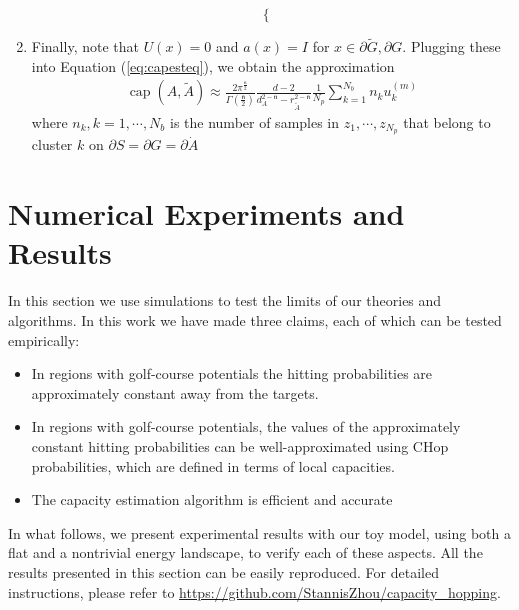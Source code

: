 \documentclass[english, aip, jcp, priprint, graphicx,floatfix]{revtex4-1}
\theoremstyle{plain}
\theoremstyle{definition}
\theoremstyle{plain}
\newcommand{\dimension}{{\mathfrak{n}}}
\begin{document}
\begin{enumerate}
\[\begin{cases}
\end{cases}
\]
\item Finally, note that $U (x) = 0$ and $a (x) = I$ for $x
\in \partial \tilde{G},\partial G$.  Plugging these into Equation (\ref{eq:capesteq}), we obtain the approximation
%
\begin{gather}
	\ensuremath{\operatorname{cap}} (A, \tilde{A}) \approx \frac{2\pi^{\frac{\dimension}{2}}}{\Gamma(\frac{\dimension}{2})}\frac{d-2}{d_A^{2-\dimension}-r_{\tilde A}^{2-\dimension}}\frac{1}{N_p} \sum_{k=1}^{N_b}n_k u_k^{(m)}
\end{gather}
where $n_k, k=1, \cdots, N_b$ is the number of samples in $z_1, \cdots, z_{N_p}$ that belong to cluster $k$ on $\partial S=\partial G=\partial \dot{A}$
%
\end{enumerate}


                                     


\section{Numerical Experiments and Results}\label{sec:experiments}
In this section we use simulations to test the limits of our theories and algorithms.  In this work we have made three claims, each of which can be tested empirically:

\begin{itemize}
\item In regions with golf-course potentials the hitting probabilities are approximately constant away from the targets.
\item In regions with golf-course potentials, the values of the approximately constant hitting probabilities can be well-approximated using CHop probabilities, which are defined in terms of local capacities.
\item The capacity estimation algorithm is efficient and accurate
\end{itemize}

In what follows, we present experimental results with our toy model, using both a flat and a nontrivial energy landscape, to verify each of these aspects.  All the results presented in this section can be easily reproduced. For detailed instructions, please refer to \url{https://github.com/StannisZhou/capacity_hopping}.
\end{document}
